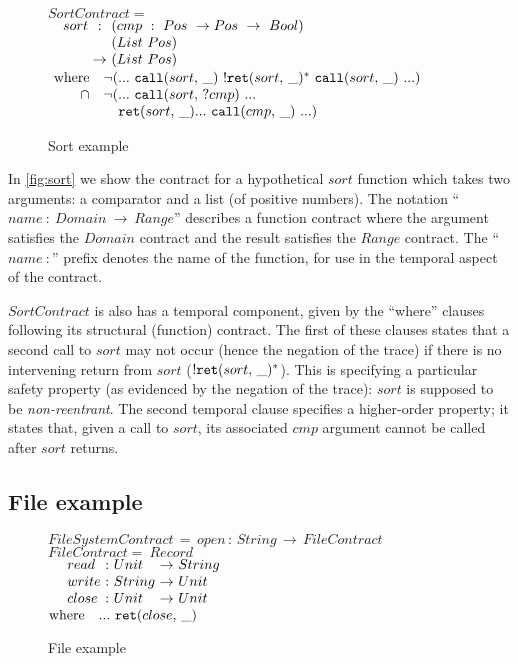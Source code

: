 \documentclass[preprint,onecolumn,9pt]{sigplanconf} %
\begin{document}
\renewcommand*{\arraystretch}{1.2}
\newcommand*{\call}[1]{\scallev{#1}{\_}}
\newcommand*{\ret}[1]{\sretev{#1}{\_}}
\begin{figure}
 $SortContract = $ \\
 $\begin{array}{ @{\quad}l@{\ } c @{\ }l }
 sort &:   &(cmp\ :\ Pos\ \to Pos\ \to\ Bool) \\
      &    &(List\ Pos) \\
      &\to &(List\ Pos) \\
 \end{array}$
 $\begin{array}{ @{~}r@{} l @{}l }
  \text{where}\quad
  &\stnot{(&\sddd~ \call{sort}~ \stmany{\snonevent{\ret{sort}}}~ \call{sort}~ \sddd)} \\
  \cap\quad
  &\stnot{(&\sddd~ \scallev{sort}{?cmp}~ \sddd~ \\
  &&\ret{sort} \sddd~ \call{cmp}~ \sddd)}
 \end{array}$
 \caption{Sort example}
 \label{fig:sort}
\end{figure}

In \autoref{fig:sort} we show the contract for a hypothetical $sort$ function which takes two arguments: a comparator and a list (of positive numbers).
%
The notation ``$\mathit{name}\ :\ Domain\ \to\ Range$'' describes a function contract where the argument satisfies the $Domain$ contract and the result satisfies the $Range$ contract.
%
The ``$\mathit{name}\ :$'' prefix denotes the name of the function, for use in the temporal aspect of the contract.

$SortContract$ is also has a temporal component, given by the ``where'' clauses following its structural (function) contract.
%
The first of these clauses states that a second call to $sort$ may not occur (hence the negation of the trace) if there is no intervening return from $sort$ ($\stmany{\snonevent{\ret{sort}}}$).
%
This is specifying a particular safety property (as evidenced by the negation of the trace): $sort$ is supposed to be \emph{non-reentrant}.
%
The second temporal clause specifies a higher-order property; it states that, given a call to $sort$, its associated $cmp$ argument cannot be called after $sort$ returns.

\subsection{File example} \label{sec:file}

\begin{figure}
 $FileSystemContract\, =\, open\, :\, String\, \to\, FileContract$ \\
 $FileContract =~ Record$ \\
 $\begin{array}{ @{\quad~}l@{\ :} @{~}l@{\ \to\ } l }
  read & Unit & String \\
  write & String & Unit \\
  close & Unit & Unit
 \end{array}$ \\
 $\text{where}\quad \sddd~ \ret{close}$
 \caption{File example}
 \label{fig:file}
\end{figure}
\end{document}
